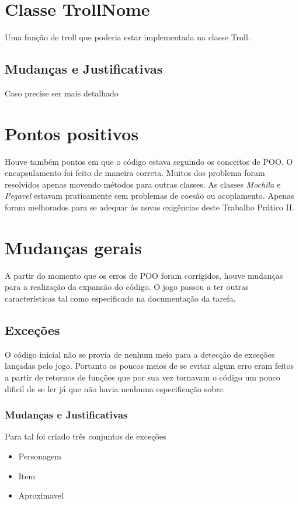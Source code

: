 \documentclass[runningheads,a4paper]{llncs}
\begin{document}
\section{Classe TrollNome}
    Uma função de troll que poderia estar implementada na classe Troll. 

    \subsection{Mudanças e Justificativas}
        Caso precise ser mais detalhado

\section{Pontos positivos}

Houve também pontos em que o código estava seguindo os conceitos de POO. O encapsulamento foi feito de maneira correta. Muitos dos problema foram resolvidos apenas movendo métodos para outras classes. As classes \emph{Mochila} e \emph{Pegavel} estavam praticamente sem problemas de coesão ou acoplamento. Apenas foram melhorados para se adequar às novas exigências deste Trabalho Prático II.

\section{Mudanças gerais}

	A partir do momento que os erros de POO foram corrigidos, houve mudanças para a realização da expansão do código. O jogo passou a ter outras características tal como especificado na documentação da tarefa.

	\subsection{Exceções}
		O código inicial não se provia de nenhum meio para a detecção de exceções lançadas pelo jogo. Portanto os poucos meios de se evitar algum erro eram feitos a partir de retornos de funções que por sua vez tornavam o código um pouco dificil de se ler já que não havia nenhuma especificação sobre.

	\subsubsection{Mudanças e Justificativas}
		Para tal foi criado três conjuntos de exceções
		\begin{itemize}
			\item Personagem
			\item Item
			\item Aproximavel
		\end{itemize}
\end{document}
